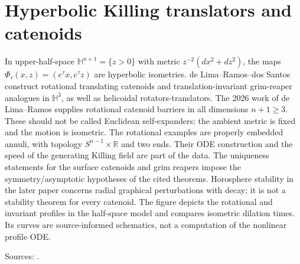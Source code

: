 \chapter{Hyperbolic Killing translators and catenoids}\label{sec:catalogue-hyperbolic-killing-catenoids}
\begin{example}\label{ex:catalogue-hyperbolic-killing-catenoids}
In upper-half-space $\mathbb H^{n+1}=\{z>0\}$ with metric $z^{-2}(dx^2+dz^2)$, the maps $\Phi_\tau(x,z)=(e^\tau x,e^\tau z)$ are hyperbolic isometries. de Lima--Ramos--dos Santos construct rotational translating catenoids and translation-invariant grim-reaper analogues in $\mathbb H^3$, as well as helicoidal rotators-translators. The 2026 work of de Lima--Ramos supplies rotational catenoid barriers in all dimensions $n+1\ge3$. These should not be called Euclidean self-expanders: the ambient metric is fixed and the motion is isometric.
The rotational examples are properly embedded annuli, with topology $S^{n-1}\times\mathbb R$ and two ends. Their ODE construction and the speed of the generating Killing field are part of the data. The uniqueness statements for the surface catenoids and grim reapers impose the symmetry/asymptotic hypotheses of the cited theorems. Horosphere stability in the later paper concerns radial graphical perturbations with decay; it is not a stability theorem for every catenoid. The figure depicts the rotational and invariant profiles in the half-space model and compares isometric dilation times. Its curves are source-informed schematics, not a computation of the nonlinear profile ODE.
\par Sources: \cite{CatLimaRamosSantos2026,CatLimaRamos2026}.
\end{example}

